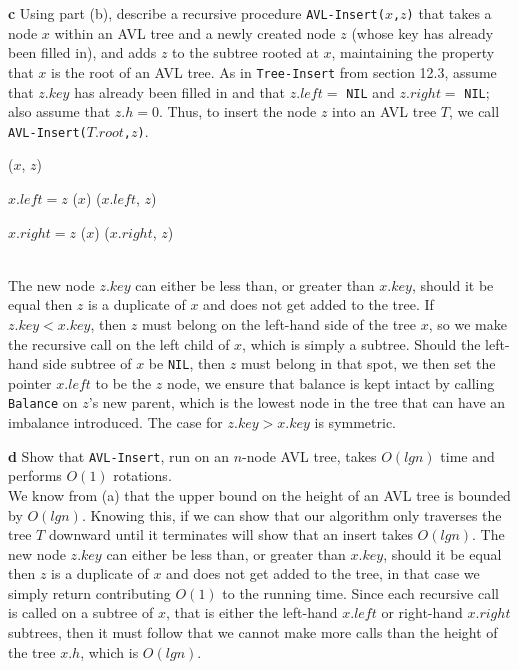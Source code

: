 \documentclass[11pt,english]{article}
\begin{document}
\newpage
\noindent \large{\textbf{c} \mdseries Using part (b), describe a recursive
procedure \texttt{AVL-Insert($x$,$z$)} that takes a node $x$ within an AVL
tree and a newly created node $z$ (whose key has already been filled in), and
adds $z$ to the subtree rooted at $x$, maintaining the property that $x$ is
the root of an AVL tree. As in \texttt{Tree-Insert} from section 12.3, assume
that $z.key$ has already been filled in and that $z.left =$ \texttt{NIL} and
$z.right =$ \texttt{NIL}; also assume that $z.h = 0$. Thus, to insert the node
$z$ into an AVL tree $T$, we call \texttt{AVL-Insert($T.root$,$z$)}.}
\begin{algorithm}
	\BlankLine
	
	\AVLInsert($x$, $z$) \\
	\Begin
	{
		
		
		{
			{
				$x.left = z$
				\Balance($x$)
			}
			{
				\AVLInsert($x.left$, $z$)
			}
		}
		
		{
			{
				$x.right = z$
				\Balance($x$)
			}
			{
				\AVLInsert($x.right$, $z$)
			}
		}
	}
\end{algorithm}\\
The new node $z.key$ can either be less than, or greater than $x.key$, should
it be equal then $z$ is a duplicate of $x$ and does not get added to the tree.
If $z.key < x.key$, then $z$ must belong on the left-hand side of the tree $x$,
so we make the recursive call on the left child of $x$, which is simply a
subtree. Should the left-hand side subtree of $x$ be \texttt{NIL}, then $z$
must belong in that spot, we then set the pointer $x.left$ to be the $z$ node,
we ensure that balance is kept intact by calling \texttt{Balance} on $z$'s new
parent, which is the lowest node in the tree that can have an imbalance
introduced. The case for $z.key > x.key$ is symmetric.

\newpage
\noindent \large{\textbf{d} \mdseries Show that \texttt{AVL-Insert}, run on an
$n$-node AVL tree, takes $O(lg n)$ time and performs $O(1)$ rotations.}
\\
We know from (a) that the upper bound on the height of an AVL tree is bounded
by $O(lg n)$. Knowing this, if we can show that our algorithm only traverses
the tree $T$ downward until it terminates will show that an insert takes
$O(lg n)$. The new node $z.key$ can either be less than, or greater than
$x.key$, should it be equal then $z$ is a duplicate of $x$ and does not get
added to the tree, in that case we simply return contributing $O(1)$ to the
running time. Since each recursive call is called on a subtree of $x$, that is
either the left-hand $x.left$ or right-hand $x.right$ subtrees, then it must
follow that we cannot make more calls than the height of the tree $x.h$, which
is $O(lg n)$.
\end{document}
